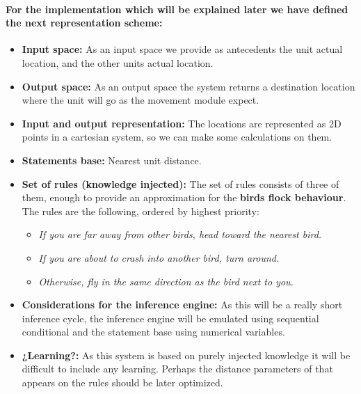 \documentclass[a4paper,10pt]{article}
\newcommand{\p}[1]{\paragraph{\indent\textnormal{#1}}}
\begin{document}
      \p{For the implementation which will be explained later we have defined the next representation scheme:}

      \begin{itemize}
      \item \textbf{Input space:} As an input space we provide as antecedents the unit actual location, and the other units actual location.
      \item \textbf{Output space:} As an output space the system returns a destination location where the unit will go as the movement module expect.
      \item \textbf{Input and output representation:} The locations are represented as 2D points in a cartesian system, so we can make some calculations on them.
      \item \textbf{Statements base:} Nearest unit distance.
      \item \textbf{Set of rules (knowledge injected):} The set of rules consists of three of them, enough to provide an approximation for the \textbf{birds flock behaviour}. The rules are the following, ordered by highest priority:
	  \begin{itemize}
	    \item \textit{If you are far away from other birds, head toward the nearest bird.}
	    \item \textit{If you are about to crash into another bird, turn around.}
	    \item \textit{Otherwise, fly in the same direction as the bird next to you.}

	  \end{itemize}
      \item \textbf{Considerations for the inference engine:} As this will be a really short inference cycle, the inference engine will be emulated using sequential conditional and the statement base using numerical variables.
      \item \textbf{¿Learning?:} As this system is based on purely injected knowledge it will be difficult to include any learning. Perhaps the distance parameters of that appears on the rules should be later optimized.
      \end{itemize}
\end{document}
